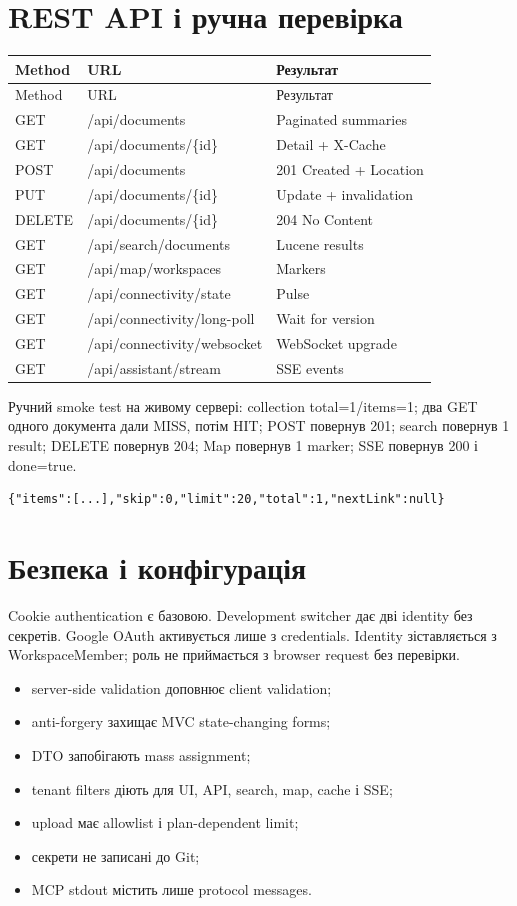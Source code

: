 \documentclass[12pt,a4paper]{article}
\begin{document}
\section{REST API і ручна перевірка}
\begin{longtable}{p{} p{} p{}}
\toprule Method & URL & Результат \\
\midrule\endfirsthead
\toprule Method & URL & Результат \\
\midrule\endhead
GET & /api/documents & Paginated summaries \\
GET & /api/documents/\{id\} & Detail + X-Cache \\
POST & /api/documents & 201 Created + Location \\
PUT & /api/documents/\{id\} & Update + invalidation \\
DELETE & /api/documents/\{id\} & 204 No Content \\
GET & /api/search/documents & Lucene results \\
GET & /api/map/workspaces & Markers \\
GET & /api/connectivity/state & Pulse \\
GET & /api/connectivity/long-poll & Wait for version \\
GET & /api/connectivity/websocket & WebSocket upgrade \\
GET & /api/assistant/stream & SSE events \\
\bottomrule\end{longtable}

Ручний smoke test на живому сервері: collection total=1/items=1; два GET одного
документа дали MISS, потім HIT; POST повернув 201; search повернув 1 result;
DELETE повернув 204; Map повернув 1 marker; SSE повернув 200 і done=true.

\begin{lstlisting}[language={},caption={Paginated response}]
{"items":[...],"skip":0,"limit":20,"total":1,"nextLink":null}
\end{lstlisting}

\section{Безпека і конфігурація}
Cookie authentication є базовою. Development switcher дає дві identity без
секретів. Google OAuth активується лише з credentials. Identity зіставляється
з WorkspaceMember; роль не приймається з browser request без перевірки.

\begin{itemize}
\item server-side validation доповнює client validation;
\item anti-forgery захищає MVC state-changing forms;
\item DTO запобігають mass assignment;
\item tenant filters діють для UI, API, search, map, cache і SSE;
\item upload має allowlist і plan-dependent limit;
\item секрети не записані до Git;
\item MCP stdout містить лише protocol messages.
\end{itemize}
\end{document}
